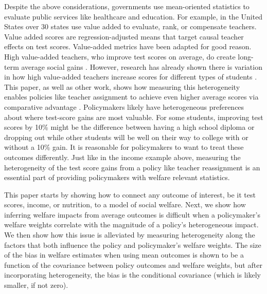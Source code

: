 \documentclass[12pt]{article}
\theoremstyle{definition}
\theoremstyle{definition}
\theoremstyle{definition}
\theoremstyle{definition}
\begin{document}
    Despite the above considerations, governments use mean-oriented statistics to evaluate public services like healthcare and education. For example, in the United States over 30 states use value added to evaluate, rank, or compensate teachers. Value added scores are regression-adjusted means that target causal teacher effects on test scores. Value-added metrics have been adapted for good reason. High value-added teachers, who improve test scores on average, do create long-term average social gains \citep[e.g.,][]{chetty2014measuring2,pope2017multidimensional}. However, research has already shown there is variation in how high value-added teachers increase scores for different types of students \citep[as in][etc.]{Delgado2020,bates2022teacher}. This paper, as well as other work, shows how measuring this heterogeneity enables policies like teacher assignment to achieve even higher average scores via comparative advantage \citep{bates2022teacher, ahn2021importance}. Policymakers likely have heterogeneous preferences about where test-score gains are most valuable. For some students, improving test scores by 10\% might be the difference between having a high school diploma or dropping out while other students will be well on their way to college with or without a 10\% gain. It is reasonable for policymakers to want to treat these outcomes differently. Just like in the income example above, measuring the heterogeneity of the test score gains from a policy like teacher reassignment is an essential part of providing policymakers with welfare relevant statistics. 

    This paper starts by showing how to connect any outcome of interest, be it test scores, income, or nutrition, to a model of social welfare. Next, we show how inferring welfare impacts from average outcomes is difficult when a policymaker's welfare weights correlate with the magnitude of a policy's heterogeneous impact. We then show how this issue is alleviated by measuring heterogeneity along the factors that both influence the policy and policymaker's welfare weights. The size of the bias in welfare estimates when using mean outcomes is shown to be a function of the covariance between policy outcomes and welfare weights, but after incorporating heterogeneity, the bias is the conditional covariance (which is likely smaller, if not zero). 
\end{document}
